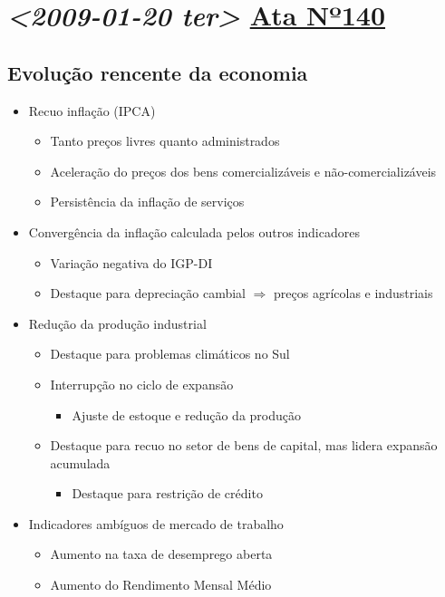 \documentclass[11pt]{article}
\begin{document}
\section*{\textit{<2009-01-20 ter> } \href{https://www.bcb.gov.br/publicacoes/atascopom/21012009}{Ata Nº140}}
\label{sec:org741d362}
\subsection*{Evolução rencente da economia}
\label{sec:orgb98bd62}
\begin{itemize}
\item Recuo inflação (IPCA)
\begin{itemize}
\item Tanto preços livres quanto administrados
\item Aceleração do preços dos bens comercializáveis e não-comercializáveis
\item Persistência da inflação de serviços
\end{itemize}
\item Convergência da inflação calculada pelos outros indicadores
\begin{itemize}
\item Variação negativa do IGP-DI
\item Destaque para depreciação cambial \(\Rightarrow\) preços agrícolas e industriais
\end{itemize}
\item Redução da produção industrial
\begin{itemize}
\item Destaque para problemas climáticos no Sul
\item Interrupção no ciclo de expansão
\begin{itemize}
\item Ajuste de estoque e redução da produção
\end{itemize}
\item Destaque para recuo no setor de bens de capital, mas lidera expansão acumulada
\begin{itemize}
\item Destaque para restrição de crédito
\end{itemize}
\end{itemize}
\item Indicadores ambíguos de mercado de trabalho
\begin{itemize}
\item Aumento na taxa de desemprego aberta
\item Aumento do Rendimento Mensal Médio

\end{itemize}
\end{itemize}
\end{document}

